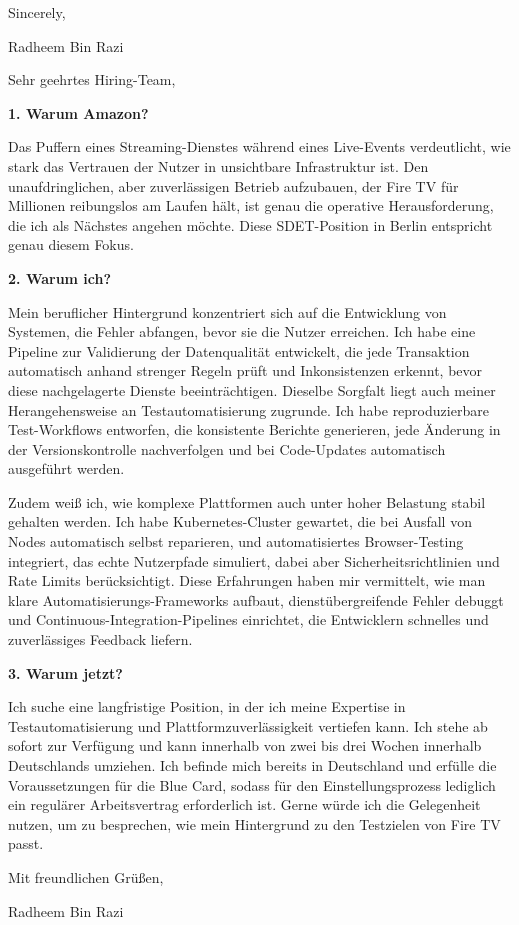 \documentclass[11pt,a4paper]{coverletter}
\begin{document}
\closing{Sincerely,}{Radheem Bin Razi}

\clearpage
{}


\opening{Sehr geehrtes Hiring-Team,}

\vspace{8pt}\noindent\textbf{1. Warum Amazon?}\par\vspace{3pt}

Das Puffern eines Streaming-Dienstes während eines Live-Events verdeutlicht, wie stark das Vertrauen der Nutzer in unsichtbare Infrastruktur ist. Den unaufdringlichen, aber zuverlässigen Betrieb aufzubauen, der Fire TV für Millionen reibungslos am Laufen hält, ist genau die operative Herausforderung, die ich als Nächstes angehen möchte. Diese SDET-Position in Berlin entspricht genau diesem Fokus.

\vspace{8pt}\noindent\textbf{2. Warum ich?}\par\vspace{3pt}

Mein beruflicher Hintergrund konzentriert sich auf die Entwicklung von Systemen, die Fehler abfangen, bevor sie die Nutzer erreichen. Ich habe eine Pipeline zur Validierung der Datenqualität entwickelt, die jede Transaktion automatisch anhand strenger Regeln prüft und Inkonsistenzen erkennt, bevor diese nachgelagerte Dienste beeinträchtigen. Dieselbe Sorgfalt liegt auch meiner Herangehensweise an Testautomatisierung zugrunde. Ich habe reproduzierbare Test-Workflows entworfen, die konsistente Berichte generieren, jede Änderung in der Versionskontrolle nachverfolgen und bei Code-Updates automatisch ausgeführt werden.

Zudem weiß ich, wie komplexe Plattformen auch unter hoher Belastung stabil gehalten werden. Ich habe Kubernetes-Cluster gewartet, die bei Ausfall von Nodes automatisch selbst reparieren, und automatisiertes Browser-Testing integriert, das echte Nutzerpfade simuliert, dabei aber Sicherheitsrichtlinien und Rate Limits berücksichtigt. Diese Erfahrungen haben mir vermittelt, wie man klare Automatisierungs-Frameworks aufbaut, dienstübergreifende Fehler debuggt und Continuous-Integration-Pipelines einrichtet, die Entwicklern schnelles und zuverlässiges Feedback liefern.

\vspace{8pt}\noindent\textbf{3. Warum jetzt?}\par\vspace{3pt}

Ich suche eine langfristige Position, in der ich meine Expertise in Testautomatisierung und Plattformzuverlässigkeit vertiefen kann. Ich stehe ab sofort zur Verfügung und kann innerhalb von zwei bis drei Wochen innerhalb Deutschlands umziehen. Ich befinde mich bereits in Deutschland und erfülle die Voraussetzungen für die Blue Card, sodass für den Einstellungsprozess lediglich ein regulärer Arbeitsvertrag erforderlich ist. Gerne würde ich die Gelegenheit nutzen, um zu besprechen, wie mein Hintergrund zu den Testzielen von Fire TV passt.

\closing{Mit freundlichen Grüßen,}{Radheem Bin Razi}
\end{document}
